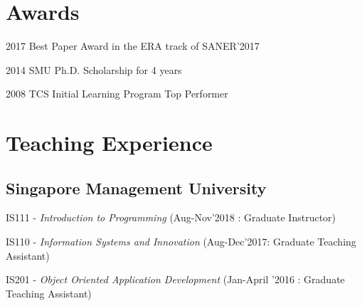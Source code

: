 \documentclass[12pt,letterpaper]{article}
\newcommand{\listitemspace}{0.15em}
\renewenvironment{itemize}
{\begin{list}{}{\setlength{\leftmargin}{0em}
				\setlength{\parskip}{0em}
				\setlength{\itemsep}{\listitemspace}
				\setlength{\parsep}{\listitemspace}}}
{\end{list}}
\begin{document}
%
%
%	
%	


\section*{Awards}
\begin{tablist}
	
	\item[2017]\tab Best Paper Award in the ERA track of SANER'2017
	\item[2014]\tab SMU Ph.D. Scholarship for 4 years
	\item[2008]\tab TCS Initial Learning Program Top Performer

\end{tablist}


\section*{Teaching Experience}

\subsection*{Singapore Management University}

\begin{itemize}
	
	\item IS111 - \textit{Introduction to Programming} (Aug-Nov'2018 : Graduate Instructor)
	
	\item IS110 - \textit{ Information Systems and Innovation} (Aug-Dec'2017: Graduate Teaching Assistant)
	
	\item IS201 - \textit{Object Oriented Application Development} (Jan-April '2016 : Graduate Teaching Assistant)
	
\end{itemize}
\end{document}
